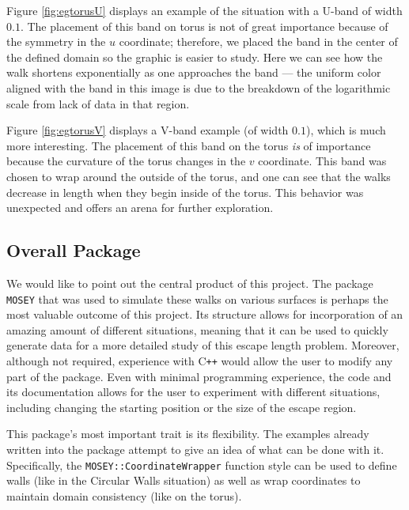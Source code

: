 \documentclass[12pt]{article}
\newcommand{\MOSEY}{\texttt{MOSEY}}
\begin{document}
		Figure \ref{fig:egtorusU} displays an example of the situation with a U-band of width $0.1$.
		The placement of this band on torus is not of great importance because of the symmetry in the $u$ coordinate; therefore, we placed the band in the center of the defined domain so the graphic is easier to study.
		Here we can see how the walk shortens exponentially as one approaches the band --- the uniform color aligned with the band in this image is due to the breakdown of the logarithmic scale from lack of data in that region.
		
		Figure \ref{fig:egtorusV} displays a V-band example (of width $0.1$), which is much more interesting.
		The placement of this band on the torus \emph{is} of importance because the curvature of the torus changes in the $v$ coordinate. %
		This band was chosen to wrap around the outside of the torus, and one can see that the walks decrease in length when they begin inside of the torus.
		This behavior was unexpected and offers an arena for further exploration.
		
	\subsection{Overall Package}
		We would like to point out the central product of this project.
		The package \MOSEY{} that was used to simulate these walks on various surfaces is perhaps the most valuable outcome of this project.
		Its structure allows for incorporation of an amazing amount of different situations, meaning that it can be used to quickly generate data for a more detailed study of this escape length problem.
		Moreover, although not required, experience with C\texttt{++} would allow the user to modify any part of the package.
		Even with minimal programming experience, the code and its documentation allows for the user to experiment with different situations, including changing the starting position or the size of the escape region.
		
		This package's most important trait is its flexibility.
		The examples already written into the package attempt to give an idea of what can be done with it.
		Specifically, the \texttt{MOSEY::CoordinateWrapper} function style can be used to define walls (like in the Circular Walls situation) as well as wrap coordinates to maintain domain consistency (like on the torus).
		
\end{document}
